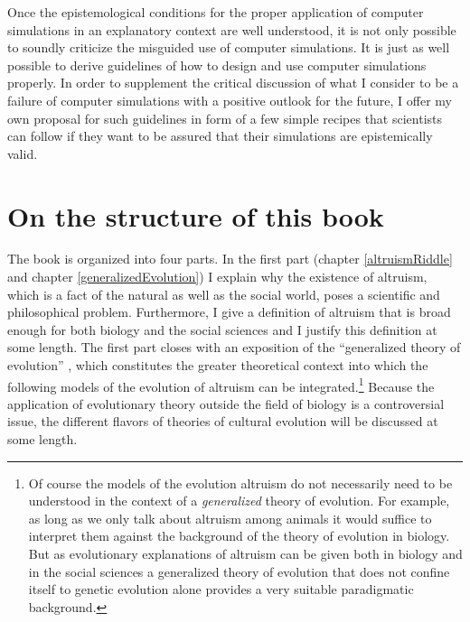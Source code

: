 Once the epistemological conditions for the proper application of
computer simulations in an explanatory context are well understood, it
is not only possible to soundly criticize the misguided use of
computer simulations. It is just as well possible to derive guidelines
of how to design and use computer simulations properly. In order to supplement
the critical discussion of what I consider to be a failure of computer
simulations with a positive outlook for the
future, I offer my own proposal for such guidelines in form of a few
simple recipes that scientists can follow if they want to be assured that
their simulations are epistemically valid.

\section{On the structure of this book}

The book is organized into four parts. In the first part (chapter
\ref{altruismRiddle} and chapter \ref{generalizedEvolution}) I explain why
the existence of altruism, which is a fact of the natural as well as the social
world, poses a scientific and philosophical problem. Furthermore, I give a
definition of altruism that is broad enough for both biology and the social
sciences and I justify this definition at some length. The first part
closes with an exposition of the ``generalized theory of evolution''
\cite[]{schurz:2001}, which constitutes the greater theoretical context into
which the following models of the evolution of altruism can be
integrated.\footnote{Of course the models of the evolution altruism do not
necessarily need to be understood in the context of a {\em generalized} theory
of evolution. For example, as long as we only talk about altruism among animals
it would suffice to interpret them against the background of the theory of
evolution in biology. But as evolutionary explanations of altruism can be given
both in biology and in the social sciences a generalized theory of evolution that
does not confine itself to genetic evolution alone provides a very suitable
paradigmatic background.} Because the application of evolutionary theory
outside the field of biology is a controversial issue, the different
flavors of theories of cultural evolution will be discussed at some length.

